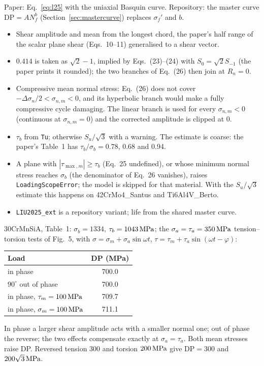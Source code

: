  Paper: Eq.~\eqref{eq:l25} with the uniaxial Basquin curve. Repository: the master curve
$\mathrm{DP}=AN_f^b$ (Section~\ref{sec:mastercurve}) replaces $\sigma_f'$ and $b$.

\begin{itemize}
\item Shear amplitude and mean from the longest chord, the paper's half range of the scalar plane shear
  (Eqs.~10--11) generalised to a shear vector.
\item $0.414$ is taken as $\sqrt2-1$, implied by Eqs.~(23)--(24) with $S_0=\sqrt2S_{-1}$ (the paper
  prints it rounded); the two branches of Eq.~(26) then join at $R_n=0$.
\item Compressive mean normal stress: Eq.~(26) does not cover $-\Delta\sigma_n/2<\sigma_{n,m}<0$, and
  its hyperbolic branch would make a fully compressive cycle damaging. The linear branch is used for
  every $\sigma_{n,m}<0$ (continuous at $\sigma_{n,m}=0$) and the corrected amplitude is clipped at 0.
\item $\tau_b$ from \texttt{Tu}; otherwise $S_u/\sqrt3$ with a warning. The estimate is coarse: the
  paper's Table~1 has $\tau_b/\sigma_b=0.78$, 0.68 and 0.94.
\item A plane with $|\tau_{\max,m}|\ge\tau_b$ (Eq.~25 undefined), or whose minimum normal stress reaches
  $\sigma_b$ (the denominator of Eq.~26 vanishes), raises \texttt{LoadingScopeError}; the model is
  skipped for that material. With the $S_u/\sqrt3$ estimate this happens on 42CrMo4\_Santus and
  Ti6Al4V\_Berto.
\item \texttt{LIU2025\_ext} is a repository variant; life from the shared master curve.
\end{itemize}

 30CrMnSiA, Table~1: $\sigma_b=1334$, $\tau_b=1043\,\mathrm{MPa}$; the
$\sigma_a=\tau_a=350\,\mathrm{MPa}$ tension--torsion tests of Fig.~5, with
$\sigma=\sigma_m+\sigma_a\sin\omega t$, $\tau=\tau_m+\tau_a\sin(\omega t-\varphi)$:
\begin{center}\small
\begin{tabular}{@{}lc@{}}
\toprule
Load & DP (MPa)\\\midrule
in phase & 700.0\\
$90^\circ$ out of phase & 700.0\\
in phase, $\tau_m=100\,\mathrm{MPa}$ & 709.7\\
in phase, $\sigma_m=100\,\mathrm{MPa}$ & 711.1\\
\bottomrule
\end{tabular}
\end{center}
In phase a larger shear amplitude acts with a smaller normal one; out of phase the reverse; the two
effects compensate exactly at $\sigma_a=\tau_a$. Both mean stresses raise DP. Reversed tension 300 and
torsion $200\,\mathrm{MPa}$ give $\mathrm{DP}=300$ and $200\sqrt3\,\mathrm{MPa}$.

